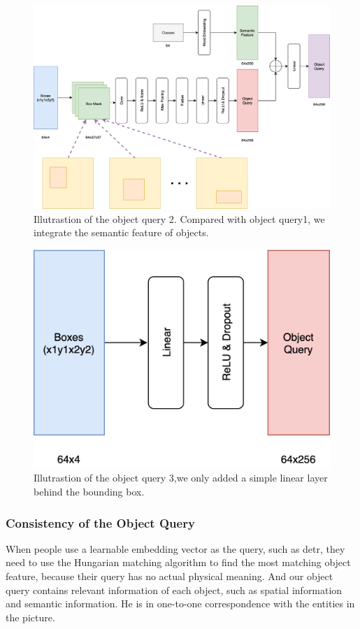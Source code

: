 \begin{figure}[tbph!]
	\centering
	\includegraphics[width=0.9\linewidth]{figures/obj_query1}
	\caption[Illutrastion of the object query 2]{Illutrastion of the object query 2. Compared with object query1, we integrate the semantic feature of objects.}
	\label{fig:objquery1}
\end{figure}

\begin{figure}[tbph!]
	\centering
	\includegraphics[width=0.5\linewidth]{figures/obj_query2}
	\caption[Illutrastion of the object query 3]{Illutrastion of the object query 3,we only added a simple linear layer behind the bounding box.}
	\label{fig:objquery2}
\end{figure}

\subsubsection{Consistency of the Object Query }

When people use a learnable embedding vector as the query, such as detr, they need to use the Hungarian matching algorithm to find the most matching object feature, because their query has no actual physical meaning. And our object query contains relevant information of each object, such as spatial information and semantic information. He is in one-to-one correspondence with the entities in the picture.

